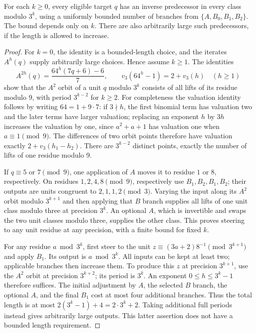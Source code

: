 \begin{lemma}\label{lem:ternary-steering}
For each $k\ge0$, every eligible target $q$ has an inverse predecessor
in every class modulo $3^k$, using a uniformly bounded number of branches
from $\{A,B_0,B_1,B_2\}$. The bound depends only on $k$.
There are also arbitrarily large such predecessors, if the length is
allowed to increase.
\end{lemma}
\begin{proof}
For $k=0$, the identity is a bounded-length choice, and the iterates
$A^h(q)$ supply arbitrarily large choices. Hence assume $k\ge1$.
The identities
\[
 A^{2h}(q)=\frac{64^h(7q+6)-6}{7},\qquad
 v_3(64^h-1)=2+v_3(h)\quad(h\ge1)
\]
show that the $A^2$ orbit of a unit $q$ modulo $3^k$ consists of all lifts
of its residue modulo 9, with period $3^{k-2}$ for $k\ge2$.
For completeness the valuation identity follows by writing $64=1+9\cdot7$:
if $3\nmid h$, the first binomial term has valuation two and the later
terms have larger valuation; replacing an exponent $h$ by $3h$ increases
the valuation by one, since $a^2+a+1$ has valuation one when $a\equiv1\pmod9$.
The differences of two orbit points therefore have valuation exactly
$2+v_3(h_1-h_2)$. There are $3^{k-2}$ distinct points, exactly the number
of lifts of one residue modulo 9.

If $q\equiv5$ or $7\pmod9$, one application of $A$ moves it to residue
$1$ or $8$, respectively. On residues $1,2,4,8\pmod9$, respectively use
$B_1,B_2,B_1,B_2$; their outputs are units congruent to $2,1,1,2\pmod3$.
Varying the input along its $A^2$ orbit modulo $3^{k+1}$ and then applying
that $B$ branch supplies all lifts of one unit class modulo three at
precision $3^k$. An optional $A$, which is invertible and swaps the two
unit classes modulo three, supplies the other class. This proves steering
to any unit residue at any precision, with a finite bound for fixed $k$.

For any residue $a\bmod3^k$, first steer to the unit
$z\equiv(3a+2)8^{-1}\pmod{3^{k+1}}$ and apply $B_1$.
Its output is $a\bmod3^k$. All inputs can be kept at least two; applicable
branches then increase them. To produce this $z$ at precision $3^{k+1}$,
use the $A^2$ orbit at precision $3^{k+2}$; its period is $3^k$.
An exponent $0\le h\le3^k-1$ therefore suffices. The initial adjustment
by $A$, the selected $B$ branch, the optional $A$, and the final $B_1$
cost at most four additional branches. Thus the total length is at most
$2(3^k-1)+4=2\cdot3^k+2$. Taking additional full periods instead
gives arbitrarily large outputs. This latter assertion does not have a
bounded length requirement.
\end{proof}

